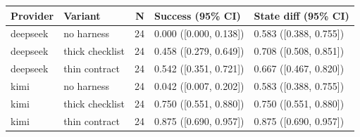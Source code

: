 \begin{tabular}{llrll}
\toprule
Provider & Variant & N & Success (95\% CI) & State diff (95\% CI) \\
\midrule
deepseek & no harness & 24 & 0.000 ([0.000, 0.138]) & 0.583 ([0.388, 0.755]) \\
deepseek & thick checklist & 24 & 0.458 ([0.279, 0.649]) & 0.708 ([0.508, 0.851]) \\
deepseek & thin contract & 24 & 0.542 ([0.351, 0.721]) & 0.667 ([0.467, 0.820]) \\
kimi & no harness & 24 & 0.042 ([0.007, 0.202]) & 0.583 ([0.388, 0.755]) \\
kimi & thick checklist & 24 & 0.750 ([0.551, 0.880]) & 0.750 ([0.551, 0.880]) \\
kimi & thin contract & 24 & 0.875 ([0.690, 0.957]) & 0.875 ([0.690, 0.957]) \\
\bottomrule
\end{tabular}
